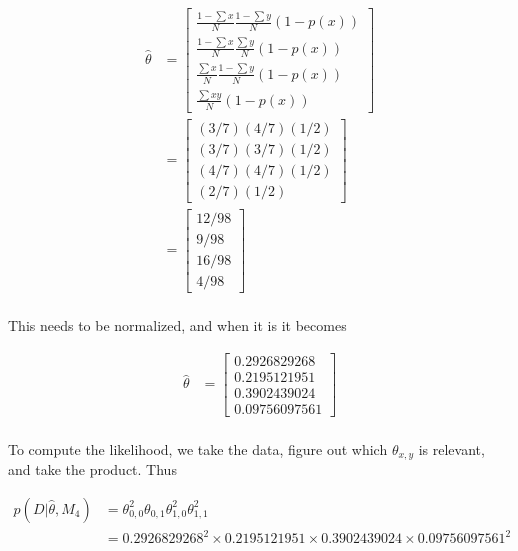 {\begin{align}
    \hat{\theta}
    & = \begin{bmatrix} \frac{1-\sum x}{N}\frac{1-\sum y}{N}(1-p(x)) \\
                        \frac{1-\sum x}{N}\frac{\sum y}{N}(1-p(x)) \\
                        \frac{\sum x}{N}\frac{1-\sum y}{N}(1-p(x)) \\
                        \frac{\sum xy}{N}(1-p(x)) \end{bmatrix} \\
    & = \begin{bmatrix} (3/7)(4/7)(1/2) \\
                        (3/7)(3/7)(1/2) \\
                        (4/7)(4/7)(1/2) \\
                        (2/7)(1/2) \end{bmatrix} \\
    & = \begin{bmatrix} 12/98 \\
                        9/98 \\
                        16/98 \\
                        4/98 \end{bmatrix} \\
\end{align}

This needs to be normalized, and when it is it becomes

\begin{align}
    \hat{\theta}
    & = \begin{bmatrix} 0.2926829268 \\
                        0.2195121951 \\
                        0.3902439024 \\
                        0.09756097561 \end{bmatrix} \\
\end{align}

To compute the likelihood, we take the data, figure out which $\theta_{x,y}$
is relevant, and take the product. Thus

\begin{align}
    p(D|\hat{\theta},M_4) & = \theta_{0,0}^2\theta_{0,1}
                              \theta_{1,0}^2\theta_{1,1}^2 \\
    & = 0.2926829268^2\times 0.2195121951\times 0.3902439024\times 0.09756097561^2
\end{align}

}
